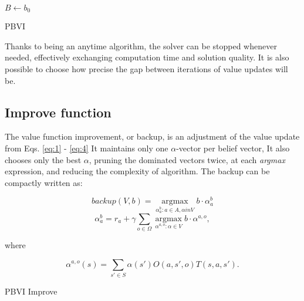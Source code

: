 \LinesNumbered
\begin{algorithm}[H]
\SetAlgoLined
$B \xleftarrow{} {b_0}$\\
\caption{PBVI}
\end{algorithm}

Thanks to being an anytime algorithm, the solver can be stopped whenever needed, effectively exchanging computation time and solution quality. It is also possible to choose how precise the gap between iterations of value updates will be.

\subsection{Improve function}

The value function improvement, or backup, is an adjustment of the value update from Eqs. \ref{eq:1} - \ref{eq:4} It maintains only one $\alpha$-vector per belief vector, It also chooses only the best $\alpha$, pruning the dominated vectors twice, at each \textit{argmax} expression, and reducing the complexity of algorithm. The backup can be compactly written as:

\begin{equation} \label{eq:5} backup(V, b) = \operatorname*{argmax}_{\alpha_{a}^{b}:a \in A, \alpha in V} b \cdot \alpha_{a}^{b}\end{equation}
\begin{equation} \label{eq:6} \alpha_{a}^{b} = r_a + \gamma \sum_{o \in \Omega} \operatorname*{argmax}_{\alpha^{a, o}:\alpha \in V} b \cdot \alpha^{a, o},\end{equation}

where

\begin{equation} \label{eq:7} \alpha^{a, o} (s) = \sum_{s' \in S} \alpha (s') O (a, s', o) T(s, a, s').\end{equation}

\LinesNumbered
\begin{algorithm}[H]
\SetAlgoLined
{}
\caption{PBVI Improve}
\end{algorithm}


